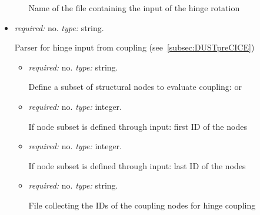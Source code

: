 \begin{itemize}
\begin{itemize}
        Name of the file containing the input of the hinge rotation
    \end{itemize}
    
    \item {} \textit{required:} no. \textit{type:} string.
    
    Parser for hinge input from coupling (see~\ref{subsec:DUSTpreCICE})
    
    \begin{itemize}
        \item {} \textit{required:} no. \textit{type:} string.
        
        Define a subset of structural nodes to evaluate coupling:  or 
        
        \item {} \textit{required:} no. \textit{type:} integer. 
        
        If node subset is defined through  input: first ID of the nodes
        
        \item {} \textit{required:} no. \textit{type:} integer. 
        
        If node subset is defined through  input: last ID of the nodes
        
        \item {} \textit{required:} no. \textit{type:} string.
        
        File collecting the IDs of the coupling nodes for hinge coupling
    \end{itemize}
    
    

    
\end{itemize}




